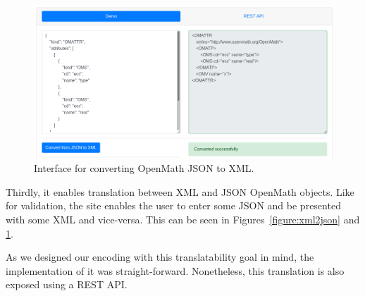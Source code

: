 \begin{figure}
    \centering
        \includegraphics[width=\textwidth]{images/json2xml}
    \caption{Interface for converting OpenMath JSON to XML. }
    \label{figure:json2xml}
\end{figure}

Thirdly, it enables translation between XML and JSON OpenMath objects. 
Like for validation, the site enables the user to enter some JSON and be presented with some XML and vice-versa. 
This can be seen in Figures~\ref{figure:xml2json} and \ref{figure:json2xml}. 

As we designed our encoding with this translatability goal in mind, the implementation of it was straight-forward. 
Nonetheless, this translation is also exposed using a REST API. 